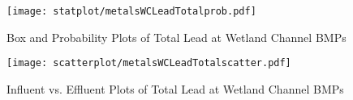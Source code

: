         \begin{figure}[hb]   %
            \centering
            \texttt{[image: statplot/metalsWCLeadTotalprob.pdf]}
            \caption{Box and Probability Plots of Total Lead at Wetland Channel BMPs}
        \end{figure}         %
        
        
        \begin{figure}[hb]   %
            \centering
            \texttt{[image: scatterplot/metalsWCLeadTotalscatter.pdf]}
            \caption{Influent vs. Effluent Plots of Total Lead at Wetland Channel BMPs}
        \end{figure}         %
        \clearpage
        